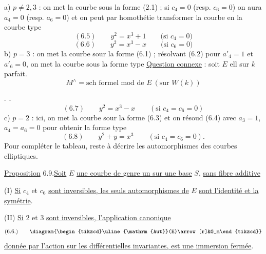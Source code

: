 a) $p\ne2,3$ : on met la courbe sous la forme (2.1) ; si $c_4=0$ (resp. $c_6=0$) on aura $a_4=0$ (resp. $a_6=0$) et on peut par homothétie transformer la courbe en la courbe type
\[
(6.5)\qquad y^2=x^3+1\qquad\text{(si }c_4=0\text{)}
\]
\[
(6.6)\qquad y^2=x^3-x\qquad\text{(si }c_6=0\text{)}
\]
b) $p=3$ : on met la courbe sour la forme (6.1) ; résolvant (6.2) pour $a'_4=1$ et $a'_6=0$, on met la courbe sous la forme type
\uline{Question connexe} : soit $E$ ell sur $k$ parfait.
\[
M^\wedge=\text{sch formel mod de }E\ (\text{sur }W(k))
\]

\margin{\[
\begin{aligned}
\unsure{\parallel|\mathrm{II}}&=\mathrm{car}\ 3:\quad6\mid v(j)\\
&=\mathrm{car}\ 2:\quad12\mid v(j)
\end{aligned}
\]}
-  -
\[
(6.7)\qquad y^2=x^3-x\qquad(\text{si }c_4=c_6=0)
\]
c) $p=2$ : ici, on met la courbe sour la forme (6.3) et on résoud (6.4) avec $a_3=1$, $a_4=a_6=0$ pour obtenir la forme type
\[
(6.8)\qquad y^2+y=x^3\qquad(\text{si }c_4=c_6=0).
\]
Pour compléter le tableau, reste à décrire les automorphismes des courbes elliptiques.

\uline{Proposition} 6.9.\quad\uline{Soit} $E$ \uline{une courbe de genre un sur une base} $S$, \uline{sans fibre additive}

(I) \uline{Si} $c_4$ et $c_6$ \uline{sont inversibles, les seuls automorphismes de} $E$ \uline{sont l'identité et la symétrie}.

(II) \uline{Si} 2 et 3 \uline{sont inversibles, l'application canonique}
\[
(6.6.)\qquad\diagram{\begin{tikzcd}\uline{\mathrm{Aut}}(E)\arrow[r]&G_m\end{tikzcd}}
\]
\uline{donnée par l'action sur les différentielles invariantes, est une immersion fermée}.

